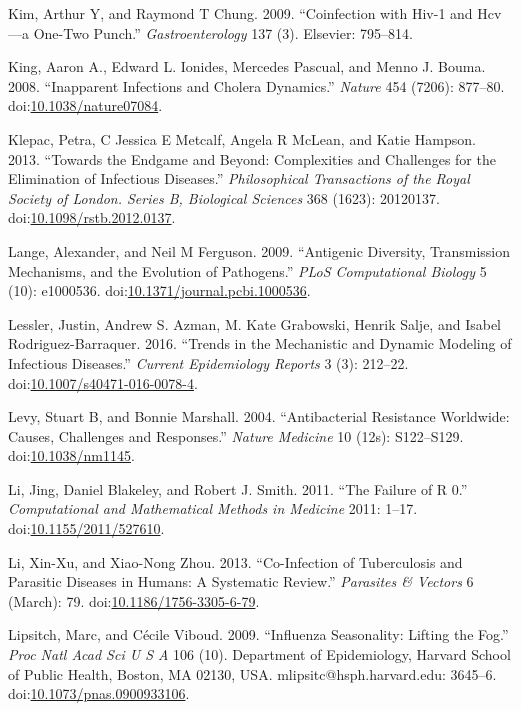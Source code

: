\documentclass[]{book}
\theoremstyle{definition}
\theoremstyle{definition}
\theoremstyle{definition}
\theoremstyle{remark}
\begin{document}
\hypertarget{ref-kim09}{}
Kim, Arthur Y, and Raymond T Chung. 2009. ``Coinfection with Hiv-1 and
Hcv---a One-Two Punch.'' \emph{Gastroenterology} 137 (3). Elsevier:
795--814.

\hypertarget{ref-king08}{}
King, Aaron A., Edward L. Ionides, Mercedes Pascual, and Menno J. Bouma.
2008. ``Inapparent Infections and Cholera Dynamics.'' \emph{Nature} 454
(7206): 877--80.
doi:\href{https://doi.org/10.1038/nature07084}{10.1038/nature07084}.

\hypertarget{ref-klepac13}{}
Klepac, Petra, C Jessica E Metcalf, Angela R McLean, and Katie Hampson.
2013. ``Towards the Endgame and Beyond: Complexities and Challenges for
the Elimination of Infectious Diseases.'' \emph{Philosophical
Transactions of the Royal Society of London. Series B, Biological
Sciences} 368 (1623): 20120137.
doi:\href{https://doi.org/10.1098/rstb.2012.0137}{10.1098/rstb.2012.0137}.

\hypertarget{ref-lange09}{}
Lange, Alexander, and Neil M Ferguson. 2009. ``Antigenic Diversity,
Transmission Mechanisms, and the Evolution of Pathogens.'' \emph{PLoS
Computational Biology} 5 (10): e1000536.
doi:\href{https://doi.org/10.1371/journal.pcbi.1000536}{10.1371/journal.pcbi.1000536}.

\hypertarget{ref-lessler16}{}
Lessler, Justin, Andrew S. Azman, M. Kate Grabowski, Henrik Salje, and
Isabel Rodriguez-Barraquer. 2016. ``Trends in the Mechanistic and
Dynamic Modeling of Infectious Diseases.'' \emph{Current Epidemiology
Reports} 3 (3): 212--22.
doi:\href{https://doi.org/10.1007/s40471-016-0078-4}{10.1007/s40471-016-0078-4}.

\hypertarget{ref-levy04}{}
Levy, Stuart B, and Bonnie Marshall. 2004. ``Antibacterial Resistance
Worldwide: Causes, Challenges and Responses.'' \emph{Nature Medicine} 10
(12s): S122--S129.
doi:\href{https://doi.org/10.1038/nm1145}{10.1038/nm1145}.

\hypertarget{ref-li11}{}
Li, Jing, Daniel Blakeley, and Robert J. Smith. 2011. ``The Failure of R
0.'' \emph{Computational and Mathematical Methods in Medicine} 2011:
1--17.
doi:\href{https://doi.org/10.1155/2011/527610}{10.1155/2011/527610}.

\hypertarget{ref-li13}{}
Li, Xin-Xu, and Xiao-Nong Zhou. 2013. ``Co-Infection of Tuberculosis and
Parasitic Diseases in Humans: A Systematic Review.'' \emph{Parasites \&
Vectors} 6 (March): 79.
doi:\href{https://doi.org/10.1186/1756-3305-6-79}{10.1186/1756-3305-6-79}.

\hypertarget{ref-lipsitch09}{}
Lipsitch, Marc, and Cécile Viboud. 2009. ``Influenza Seasonality:
Lifting the Fog.'' \emph{Proc Natl Acad Sci U S A} 106 (10). Department
of Epidemiology, Harvard School of Public Health, Boston, MA 02130, USA.
mlipsitc@hsph.harvard.edu: 3645--6.
doi:\href{https://doi.org/10.1073/pnas.0900933106}{10.1073/pnas.0900933106}.
\end{document}
